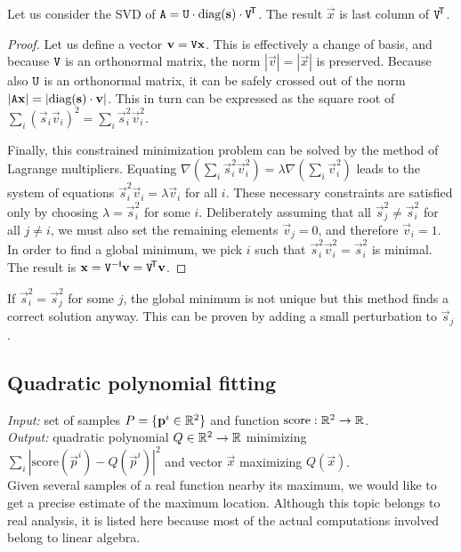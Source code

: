 Let us consider the SVD of $\mathtt{A} = \mathtt{U} \cdot \textrm{diag}(\mathbf{s}) \cdot \mathtt{V}^{\!\mathsf{T}}$.
The result $\vec x$ is last column of $\mathtt{V} ^{\!\mathsf{T}}$.

\begin{proof}
Let us define a vector $\mathbf{v} = \mathtt{V} \mathbf{x}$.
This is effectively a change of basis, and because $\mathtt{V}$ is an orthonormal matrix, the norm $|\vec v| = |\vec x|$ is preserved.
Because also $\mathtt{U}$ is an orthonormal matrix, it can be safely crossed out of the norm $|\mathtt{A} \mathbf{x}| = |\textrm{diag}(\mathbf{s}) \cdot \mathbf{v}|$.
This in turn can be expressed as the square root of $\sum_i (\vec s_i \vec v_i)^2 = \sum_i \vec s_i^2 \vec v_i^2$.

Finally, this constrained minimization problem can be solved by the method of Lagrange multipliers.
Equating $\nabla(\sum_i \vec s_i^2 \vec v_i^2) = \lambda \nabla (\sum_i \vec v_i^2)$ leads to the system of equations $\vec s_i^2 \vec v_i = \lambda \vec v_i$ for all $i$.
These necessary constraints are satisfied only by choosing $\lambda = \vec s_i^2$ for some $i$.
Deliberately assuming that all $\vec s_j^2 \neq \vec s_i^2$ for all $j \neq i$, we must also set the remaining elements $\vec v_j = 0$, and therefore $\vec v_i = 1$.
In order to find a global minimum, we pick $i$ such that $\vec s_i^2 \vec v_i^2 = \vec s_i^2$ is minimal.
The result is $\mathbf{x} = \mathtt{V} ^{-\mathsf{I}} \mathbf{v} = \mathtt{V} ^{\!\mathsf{T}} \mathbf{v}$.
\end{proof}

If $\vec s_i^2 = \vec s_j^2$ for some $j$, the global minimum is not unique but this method finds a correct solution anyway.
This can be proven by adding a small perturbation to $\vec s_j$.

\subsection{Quadratic polynomial fitting}
\textit{Input:} set of samples $P = \{\mathbf{p}^i \in \mathbb{R}^2 \}$ and function $\textrm{score}: \mathbb{R}^2 \to \mathbb{R}$.\\
\textit{Output:} quadratic polynomial $Q \in \mathbb{R}^2 \to \mathbb{R}$ minimizing $\sum_i |\textrm{score}(\vec p^i) - Q(\vec p^i)|^2$ and vector $\vec x$ maximizing $Q(\vec x)$.\\

Given several samples of a real function nearby its maximum, we would like to get a precise estimate of the maximum location.
Although this topic belongs to real analysis, it is listed here because most of the actual computations involved belong to linear algebra.

